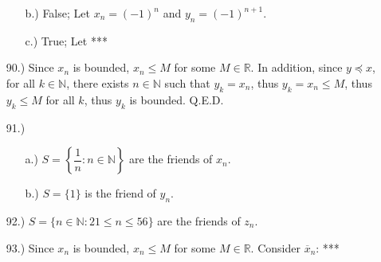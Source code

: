 \documentclass[12pt]{article}
\begin{document}
\begin{itemize}
\begin{itemize}
        \item [b.)] False; Let $x_n=(-1)^n$ and $y_n=(-1)^{n+1}$. 

        \item [c.)] True; Let ***
    \end{itemize}




    \item [90.)] Since $x_n$ is bounded, $x_n\leq M$ for some $M\in\mathbb{R}$. In addition, since $y\preceq x$, for all $k\in\mathbb{N}$, there exists $n\in\mathbb{N}$ such that $y_k=x_n$, thus $y_k=x_n\leq M$, thus $y_k\leq M$ for all $k$, thus $y_k$ is bounded. Q.E.D.

    \item [91.)] \begin{itemize}
        \item [a.)] $S=\left\{\dfrac{1}{n}:n\in\mathbb{N}\right\}$ are the friends of $x_n$.

        \item [b.)] $S=\{1\}$ is the friend of $y_n$.
    \end{itemize}

    \item [92.)] $S=\{n\in\mathbb{N}:21\leq n\leq56\}$ are the friends of $z_n$.

    \item [93.)] Since $x_n$ is bounded, $x_n\leq M$ for some $M\in\mathbb{R}$. Consider $\overline{x}_n$: ***










\end{itemize}
\end{document}
